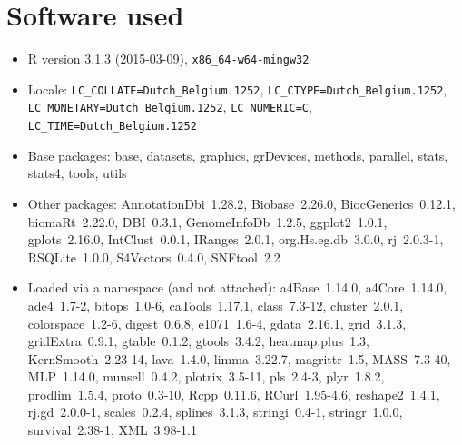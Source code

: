 \documentclass[a4paper]{article}
\begin{document}
\section{Software used}
\begin{itemize}\raggedright
  \item R version 3.1.3 (2015-03-09), \verb|x86_64-w64-mingw32|
  \item Locale: \verb|LC_COLLATE=Dutch_Belgium.1252|, \verb|LC_CTYPE=Dutch_Belgium.1252|, \verb|LC_MONETARY=Dutch_Belgium.1252|, \verb|LC_NUMERIC=C|, \verb|LC_TIME=Dutch_Belgium.1252|
  \item Base packages: base, datasets,
    graphics, grDevices, methods, parallel,
    stats, stats4, tools, utils
  \item Other packages:
    AnnotationDbi~1.28.2, Biobase~2.26.0,
    BiocGenerics~0.12.1, biomaRt~2.22.0,
    DBI~0.3.1, GenomeInfoDb~1.2.5,
    ggplot2~1.0.1, gplots~2.16.0,
    IntClust~0.0.1, IRanges~2.0.1,
    org.Hs.eg.db~3.0.0, rj~2.0.3-1,
    RSQLite~1.0.0, S4Vectors~0.4.0,
    SNFtool~2.2
  \item Loaded via a namespace (and not
    attached): a4Base~1.14.0, a4Core~1.14.0,
    ade4~1.7-2, bitops~1.0-6,
    caTools~1.17.1, class~7.3-12,
    cluster~2.0.1, colorspace~1.2-6,
    digest~0.6.8, e1071~1.6-4, gdata~2.16.1,
    grid~3.1.3, gridExtra~0.9.1,
    gtable~0.1.2, gtools~3.4.2,
    heatmap.plus~1.3, KernSmooth~2.23-14,
    lava~1.4.0, limma~3.22.7, magrittr~1.5,
    MASS~7.3-40, MLP~1.14.0, munsell~0.4.2,
    plotrix~3.5-11, pls~2.4-3, plyr~1.8.2,
    prodlim~1.5.4, proto~0.3-10,
    Rcpp~0.11.6, RCurl~1.95-4.6,
    reshape2~1.4.1, rj.gd~2.0.0-1,
    scales~0.2.4, splines~3.1.3,
    stringi~0.4-1, stringr~1.0.0,
    survival~2.38-1, XML~3.98-1.1
\end{itemize}
\end{document}
